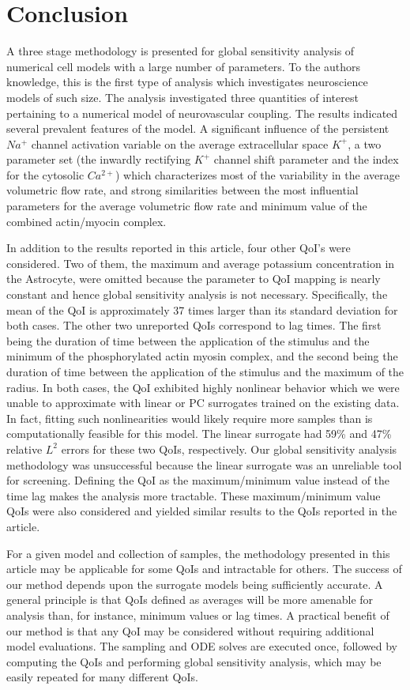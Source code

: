 \documentclass[smallextended]{svjour3}
\numberwithin{equation}{section}
\begin{document}
\section{Conclusion}
 A three stage methodology is presented for global sensitivity analysis of numerical cell models with a large number of parameters. To the authors knowledge, this is the first type of analysis which investigates neuroscience models of such size. The analysis investigated three quantities of interest pertaining to a numerical model of neurovascular coupling. The results indicated several prevalent features of the model. A significant influence of the persistent $Na^+$ channel activation variable on the average extracellular space $K^+$, a two parameter set (the inwardly rectifying $K^+$ channel shift parameter and the index for the cytosolic $Ca^{2+}$) which characterizes most of the variability in the average volumetric flow rate, and strong similarities between the most influential parameters for the average volumetric flow rate and minimum value of the combined actin/myocin complex.
 
In addition to the results reported in this article, four other QoI's were considered. Two of them, the maximum and average potassium concentration in the Astrocyte, were omitted because the parameter to QoI mapping is nearly constant and hence global sensitivity analysis is not necessary. Specifically, the mean of the QoI is approximately 37 times larger than its standard deviation for both cases. The other two unreported QoIs correspond to lag times. The first being the duration of time between the application of the stimulus and the minimum of the phosphorylated actin myosin complex, and the second being the duration of time between the application of the stimulus and the maximum of the radius. In both cases, the QoI exhibited highly nonlinear behavior which we were unable to approximate with linear or PC surrogates trained on the existing data. In fact, fitting such nonlinearities would likely require more samples than is computationally feasible for this model. The linear surrogate had 59\% and 47\% relative $L^2$ errors for these two QoIs, respectively. Our global sensitivity analysis methodology was unsuccessful because the linear surrogate was an unreliable tool for screening. Defining the QoI as the maximum/minimum value instead of the time lag makes the analysis more tractable. These maximum/minimum value QoIs were also considered and yielded similar results to the QoIs reported in the article.

For a given model and collection of samples, the methodology presented in this article may be applicable for some QoIs and intractable for others. The success of our method depends upon the surrogate models being sufficiently accurate. A general principle is that QoIs defined as averages will be more amenable for analysis than, for instance, minimum values or lag times. A practical benefit of our method is that any QoI may be considered without requiring additional model evaluations. The sampling and ODE solves are executed once, followed by computing the QoIs and performing global sensitivity analysis, which may be easily repeated for many different QoIs.
 
\end{document}
